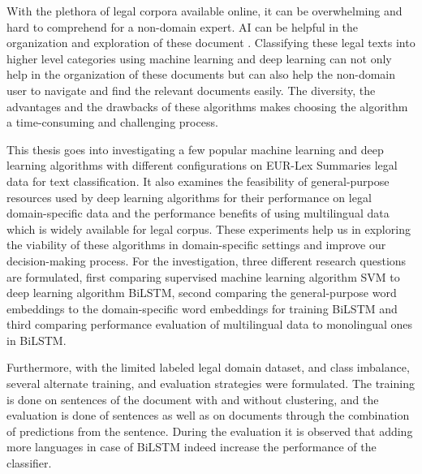 With the plethora of legal corpora available online, it can be overwhelming and hard to comprehend for a non-domain expert. \gls{AI} can be helpful in the organization and exploration of these document \cite{merkl1997exploration}.  Classifying these legal texts into higher level categories using machine learning and deep learning can not only help in the organization of these documents but can also help the non-domain user to navigate and find the relevant documents easily. The diversity, the advantages and the drawbacks of these algorithms makes choosing the algorithm a time-consuming and challenging process.

This thesis goes into investigating a few popular machine learning and deep learning algorithms with different configurations on EUR-Lex Summaries legal data for text classification. It also examines the feasibility of general-purpose resources used by deep learning algorithms for their performance on legal domain-specific data and the performance benefits of using multilingual data which is widely available for legal corpus. These experiments help us in exploring the viability of these algorithms in domain-specific settings and improve our decision-making process.  For the investigation, three different research questions are formulated, first comparing supervised machine learning algorithm  \gls{SVM} to deep learning algorithm \gls{BiLSTM}, second comparing the general-purpose word embeddings to the domain-specific word embeddings for training \gls{BiLSTM} and third comparing performance evaluation of multilingual data to monolingual ones in \gls{BiLSTM}.

Furthermore, with the limited labeled legal domain dataset, and class imbalance, several alternate training, and evaluation strategies were formulated. The training is done on sentences of the document with and without clustering, and the evaluation is done of sentences as well as on documents through the combination of predictions from the sentence. During the evaluation it is observed that adding more languages in case of \gls{BiLSTM} indeed increase the performance of the classifier.































